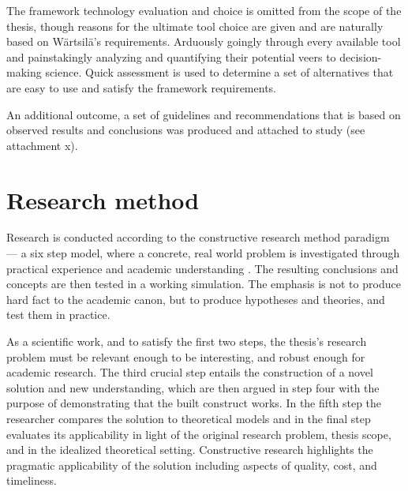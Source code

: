 \documentclass[12pt,a4paper,oneside,pdftex]{report}
\begin{document}
The framework technology evaluation and choice is omitted from the scope of the thesis, though reasons for the ultimate tool choice are given and are naturally based on Wärtsilä's requirements. Arduously goingly through every available tool and painstakingly analyzing and quantifying their potential veers to decision-making science. Quick assessment is used to determine a set of alternatives that are easy to use and satisfy the framework requirements.

An additional outcome, a set of guidelines and recommendations that is based on observed results and conclusions was produced and attached to study (see attachment x). %


\section{Research method}
Research is conducted according to the constructive research method paradigm --- a six step model, where a concrete, real world problem is investigated through practical experience and academic understanding \citep{kasanen1993constructive, shaw2001research}. The resulting conclusions and concepts are then tested in a working simulation. The emphasis is not to produce hard fact to the academic canon, but to produce hypotheses and theories, and test them in practice.

As a scientific work, and to satisfy the first two steps, the thesis's research problem must be relevant enough to be interesting, and robust enough for academic research. The third crucial step entails the construction of a novel solution and new understanding, which are then argued in step four with the purpose of demonstrating that the built construct works. In the fifth step the researcher compares the solution to theoretical models and in the final step evaluates its applicability in light of the original research problem, thesis scope, and in the idealized theoretical setting. Constructive research highlights the pragmatic applicability of the solution including aspects of quality, cost, and timeliness.

\begin{comment}
Below to reference works from SoberIT slideset.

Kasanen, Eero, Lukka Kari, and Arto Siitonen. 1993. The Constructive Approach in Management Accounting Research. Journal of Management Accounting Research, 5 (1), pp. 243-263.

Shaw, M. 2001. The Coming-of-Age of Software Architecture Research. Proceedings of ICSE-2001, pp. 657-664. Los Alamitos, CA: IEEE Computer Society Press.
\end{comment}
\end{document}

